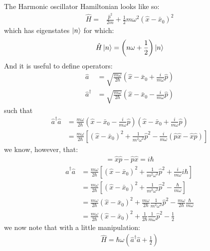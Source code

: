 The Harmonic oscillator Hamiltonian looks like so:
\begin{align*}
	\hat{H} =& \frac{\hat{p}^2}{2 m} + \frac{1}{2} m \omega^2 \left(  \hat{x} - \bar{x}_0 \right)^2
\end{align*}
which has eigenstates $\ket{n}$ for which:
\begin{align}
	\hat{H} \ket{n} = \left( n \omega + \frac{1}{2} \right) \ket{n}
\end{align}
And it is useful to define operators:
\begin{align*}
	\hat{a} &= \sqrt{\frac{m \omega}{2 \hbar}} \left( \hat{x} - \bar{x}_0 + \frac{i}{m \omega} \hat{p}  \right) \\
	\hat{a}^{\dagger} &= \sqrt{\frac{m \omega}{2 \hbar}} \left( \hat{x} - \bar{x}_0 - \frac{i}{m \omega} \hat{p}  \right)
\end{align*}
such that
\begin{align}
	\hat{a}^{\dagger} \hat{a} &= \frac{m \omega}{2 \hbar} \left( \hat{x} - \bar{x}_0 - \frac{i}{m \omega} \hat{p}  \right) \left( \hat{x} - \bar{x}_0 + \frac{i}{m \omega} \hat{p}  \right) \\
	&=\frac{m \omega}{2 \hbar} \left[  \left(  \hat{x} - \bar{x}_0 \right)^2 +  \frac{1}{m^2 \omega^2} \hat{p}^2  - \frac{i}{m \omega} \left( \hat{p} \hat{x} - \hat{x} \hat{p} \right) \right]
\end{align}
we know, however, that:
\begin{align}
	[\hat{x}, \hat{p}] = \hat{x} \hat{p}  - \hat{p} \hat{x} = i \hbar
\end{align}\begin{align}
	\hat{a}^{\dagger} \hat{a} &=\frac{m \omega}{2 \hbar} \left[  \left(  \hat{x} - \bar{x}_0 \right)^2 +  \frac{1}{m^2 \omega^2} \hat{p}^2  +\frac{i}{m \omega} i \hbar \right] \\
	&=\frac{m \omega}{2 \hbar} \left[  \left(  \hat{x} - \bar{x}_0 \right)^2 +  \frac{1}{m^2 \omega^2} \hat{p}^2  -\frac{\hbar}{m \omega} \right]\\
	&= \frac{m \omega}{2 \hbar}  \left(  \hat{x} - \bar{x}_0 \right)^2 +  \frac{m \omega}{2 \hbar} \frac{1}{m^2 \omega^2} \hat{p}^2  -\frac{m \omega}{2 \hbar}  \frac{\hbar}{m \omega} \\
	&= \frac{m \omega}{2 \hbar}  \left(  \hat{x} - \bar{x}_0 \right)^2 +  \frac{1}{2 \hbar} \frac{1}{m \omega} \hat{p}^2  -\frac{1}{2 }
\end{align}
we now note that with a little manipulation:
\begin{align}
	\hat{H} = \hbar \omega \left(  \hat{a}^{\dagger} \hat{a} + \frac{1}{2}\right)
\end{align}
